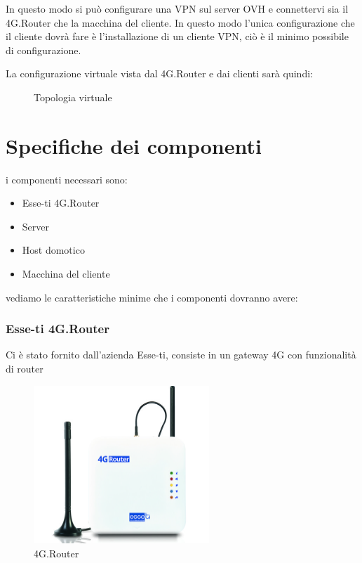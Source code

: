 In questo modo si pu\`o configurare una VPN sul server OVH e connettervi sia il 4G.Router che la macchina del cliente. In questo modo l'unica configurazione che il cliente dovr\`a fare \`e l'installazione di un cliente VPN, ci\`o \`e il minimo possibile di configurazione.

La configurazione virtuale vista dal 4G.Router e dai clienti sar\`a quindi:

\begin{figure}[ht]
	\centering
	
	\caption{Topologia virtuale}

	
\end{figure}


\section{Specifiche dei componenti}

i componenti necessari sono:

\begin{itemize}
	\item Esse-ti 4G.Router
	\item Server
	\item Host domotico
	\item Macchina del cliente
\end{itemize}

vediamo le caratteristiche minime che i componenti dovranno avere:

\subsubsection{Esse-ti 4G.Router}

Ci \`e stato fornito dall'azienda Esse-ti, consiste in un gateway 4G con funzionalità di router


\begin{figure}[ht]
	\centering
	\includegraphics[width=250px]{immagini/4grouter.jpg}
	\caption{4G.Router}

	
\end{figure}

